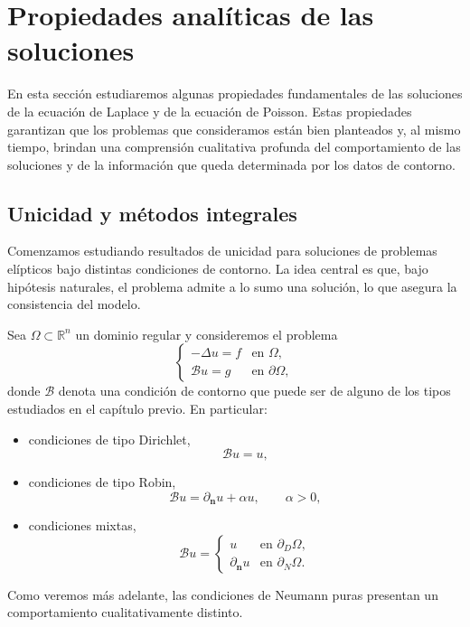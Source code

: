 \documentclass[12pt, a4paper]{amsbook}
\newcommand{\R}{{\mathbb R}}
\newcommand{\n}{{\mathbf n}}
\theoremstyle{remark}
\theoremstyle{definition}
\numberwithin{section}{chapter}
\numberwithin{subsection}{section}
\numberwithin{equation}{section}
\numberwithin{figure}{chapter}
\begin{document}
\section{Propiedades analíticas de las soluciones}

En esta sección estudiaremos algunas propiedades fundamentales de las soluciones de la ecuación de Laplace y de la ecuación de Poisson. Estas propiedades garantizan que los problemas que consideramos están bien planteados y, al mismo tiempo, brindan una comprensión cualitativa profunda del comportamiento de las soluciones y de la información que queda determinada por los datos de contorno.

\subsection{Unicidad y métodos integrales}

Comenzamos estudiando resultados de unicidad para soluciones de problemas elípticos bajo distintas condiciones de contorno. La idea central es que, bajo hipótesis naturales, el problema admite a lo sumo una solución, lo que asegura la consistencia del modelo.

Sea $\Omega\subset \R^n$ un dominio regular y consideremos el problema
\[
\begin{cases}
-\Delta u = f & \text{en } \Omega,\\
\mathcal{B}u = g & \text{en } \partial \Omega,
\end{cases}
\]
donde $\mathcal{B}$ denota una condición de contorno que puede ser de alguno de los tipos estudiados en el capítulo previo. En particular:
\begin{itemize}
\item condiciones de tipo Dirichlet,
\[
\mathcal{B}u = u,
\]
\item condiciones de tipo Robin,
\[
\mathcal{B}u = \partial_\n u + \alpha u,\qquad \alpha>0,
\]
\item condiciones mixtas,
\[
\mathcal{B}u =
\begin{cases}
u & \text{en } \partial_D \Omega,\\
\partial_\n u & \text{en } \partial_N \Omega.
\end{cases}
\]
\end{itemize}
Como veremos más adelante, las condiciones de Neumann puras presentan un comportamiento cualitativamente distinto.
\end{document}
